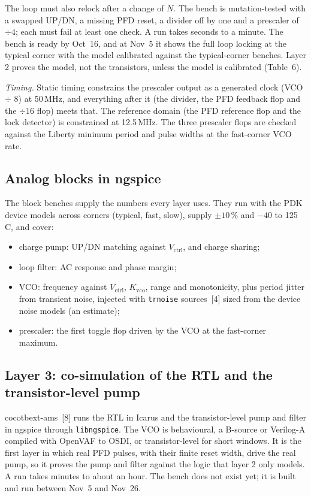 \documentclass[11pt]{article}
\newcommand{\pin}[1]{\texttt{#1}}              %
\newcommand{\MHz}{\,MHz}
\newcommand{\kvco}{K_\mathrm{vco}}
\newcommand{\vctrl}{V_\mathrm{ctrl}}
\begin{document}
The loop must also relock after a change of $N$. The bench is mutation-tested with a swapped UP/DN, a missing PFD reset, a divider off by one and a prescaler of $\div 4$; each must fail at least one check. A run takes seconds to a minute. The bench is ready by Oct~16, and at Nov~5 it shows the full loop locking at the typical corner with the model calibrated against the typical-corner benches. Layer 2 proves the model, not the transistors, unless the model is calibrated (Table~6).

\emph{Timing.} Static timing constrains the prescaler output as a generated clock (VCO $\div$ 8) at 50\MHz, and everything after it (the divider, the PFD feedback flop and the $\div 16$ flop) meets that. The reference domain (the PFD reference flop and the lock detector) is constrained at 12.5\MHz. The three prescaler flops are checked against the Liberty minimum period and pulse widths at the fast-corner VCO rate.

\subsection{Analog blocks in ngspice}\label{sec:blocks}
The block benches supply the numbers every layer uses. They run with the PDK device models across corners (typical, fast, slow), supply $\pm 10$\,\% and $-40$ to 125\,\textdegree C, and cover:

\begin{itemize}[leftmargin=18pt,itemsep=2pt,topsep=4pt]
\item charge pump: UP/DN matching against $\vctrl$, and charge sharing;
\item loop filter: AC response and phase margin;
\item VCO: frequency against $\vctrl$, $\kvco$, range and monotonicity, plus period jitter from transient noise, injected with \pin{trnoise} sources~[4] sized from the device noise models (an estimate);
\item prescaler: the first toggle flop driven by the VCO at the fast-corner maximum.
\end{itemize}

\subsection{Layer 3: co-simulation of the RTL and the transistor-level pump}
cocotbext-ams~[8] runs the RTL in Icarus and the transistor-level pump and filter in ngspice through \pin{libngspice}. The VCO is behavioural, a B-source or Verilog-A compiled with OpenVAF to OSDI, or transistor-level for short windows. It is the first layer in which real PFD pulses, with their finite reset width, drive the real pump, so it proves the pump and filter against the logic that layer 2 only models. A run takes minutes to about an hour. The bench does not exist yet; it is built and run between Nov~5 and Nov~26.
\end{document}
